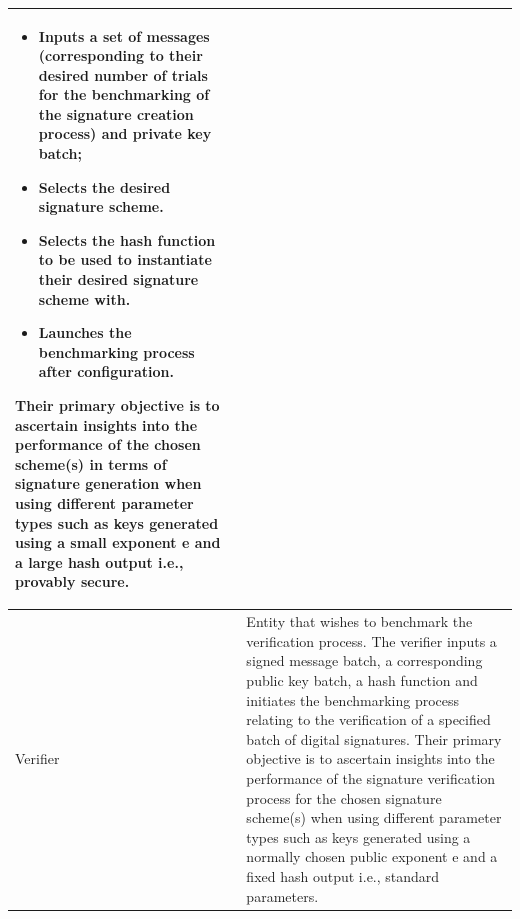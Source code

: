 \documentclass[]{final_report}
\theoremstyle{definition}
\begin{document}
\begin{table}[H]
\begin{tabular}{|l|p{10cm}|}
\begin{itemize}
\begin{itemize}
\item Inputs a set of messages (corresponding to their desired number of trials for the benchmarking of the signature creation process) and private key batch;
\item Selects the desired signature scheme.
\item Selects the hash function to be used to instantiate their desired signature scheme with. 
\item Launches the benchmarking process after configuration.
\end{itemize}  
\end{itemize} 
Their primary objective is to ascertain insights into the performance of the chosen scheme(s) in terms of signature generation when using different parameter types such as keys generated using a small exponent e and a large hash output i.e., provably secure.\\
    \hline
    Verifier & Entity that wishes to benchmark the verification process. The verifier inputs a signed message batch, a corresponding public key batch, a hash function and initiates the benchmarking process relating to the verification of a specified batch of digital signatures. Their primary objective is to ascertain insights into the performance of the signature verification process for the chosen signature scheme(s) when using different parameter types such as keys generated using a normally chosen public exponent e and a fixed hash output i.e., standard parameters.  \\
    \hline
    \end{tabular}
\end{table}
\end{document}
